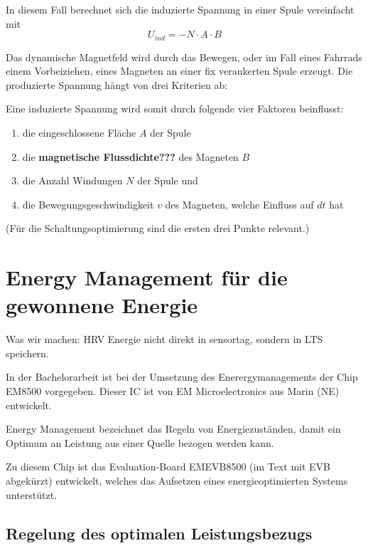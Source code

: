  
In diesem Fall berechnet sich die induzierte Spannung in einer Spule vereinfacht mit
\begin{equation}
    U_{ind}= - N \cdot A \cdot B
\end{equation}

Das dynamische Magnetfeld wird durch das Bewegen, oder im Fall eines Fahrrads einem Vorbeiziehen, eines Magneten an einer fix verankerten Spule erzeugt.
Die produzierte Spannung hängt von drei Kriterien ab:

Eine induzierte Spannung wird somit durch folgende vier Faktoren beinflusst:
\begin{enumerate}
    \item die eingeschlossene Fläche $A$ der Spule    
    \item die \textbf{magnetische Flussdichte???} des Magneten $B$ 
    \item die Anzahl Windungen $N$ der Spule und
    \item die Bewegungsgeschwindigkeit $v$ des Magneten, welche Einfluss auf $dt$ hat
\end{enumerate}

(Für die Schaltungsoptimierung sind die ersten drei Punkte relevant.)

\section{Energy Management für die gewonnene Energie}
Was wir machen: HRV Energie nicht direkt in sensortag, sondern in LTS speichern.

In der Bachelorarbeit ist bei der Umsetzung des Enerergymanagements der Chip EM8500 vorgegeben. Dieser IC ist von EM Microelectronics aus Marin (NE) entwickelt. %


Energy Management bezeichnet das Regeln von Energiezuständen, damit ein Optimum an Leistung aus einer Quelle bezogen werden kann.



Zu diesem Chip ist das Evaluation-Board EMEVB8500 (im Text mit EVB abgekürzt) entwickelt, welches das Aufsetzen eines energieoptimierten Systems unterstützt. 


\subsection{Regelung des optimalen Leistungsbezugs}

